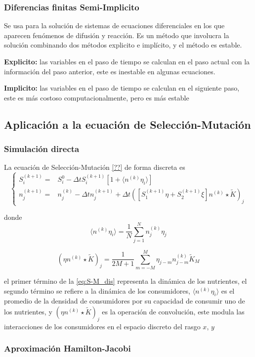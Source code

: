     \subsubsection{Diferencias finitas Semi-Implicito}

        Se usa para la solución de sistemas de ecuaciones diferenciales en los que aparecen fenómenos de difusión y reacción. Es un método que involucra la solución combinando dos métodos explicito e implícito, y el método es estable.

        \textbf{Explicito:} las variables en el paso de tiempo se calculan en el paso actual con la información del paso anterior, este es inestable en algunas ecuaciones.

        \textbf{Implicito:} las variables en el paso de tiempo se calculan en el siguiente paso, este es más costoso computacionalmente, pero es más estable

    \subsection{Aplicación a la ecuación de Selección-Mutación}
    \subsubsection{Simulación directa}

    La ecuación de Selección-Mutación \eqref{??} de forma discreta es
    \begin{equation}
        \left\{\begin{matrix}
            S_{i}^{(k+1)} = &  S_{i}^{0}-\Delta tS_{i}^{(k+1)}[1+\langle{n^{(k)}\eta_{i}}\rangle  ] \\
            n_{j}^{(k+1)} = &  n_{j}^{(k)}-\Delta t n_{j}^{(k+1)}+\Delta t([S_{1}^{(k+1)}\eta+S_{2}^{(k+1)}\xi]n^{(k)}\star \tilde{K})_{j}
        \end{matrix}\right.
    \label{eq:S-M_dis}
    \end{equation}

    donde 
    \begin{equation*}
        \langle{n^{(k)}\eta_{i}}\rangle = \frac{1}{N}\sum_{j=1}^{N}n_{j}^{(k)}\eta_{j}
    \end{equation*}

    \begin{equation*}
        (\eta n^{(k)}\star \tilde{K})_{j}=\frac{1}{2M+1}\sum_{m=-M}^{M}\eta_{j-m}n_{j-m}^{(k)}\tilde{K}_{M}
    \end{equation*}

    el primer término de la \eqref{eq:S-M_dis} representa la dinámica de los nutrientes, el segundo término se refiere a la dinámica de los consumidores, $\langle{n^{(k)}\eta_{i}}\rangle$ es el promedio de la densidad de consumidores por su capacidad de consumir uno de los nutrientes, y $(\eta n^{(k)}\star \tilde{K})_{j}$ es la operación de convolución, este modula las interacciones de los consumidores en el espacio discreto del rasgo $x$, $y$

    \subsubsection{Aproximación Hamilton-Jacobi}

    
